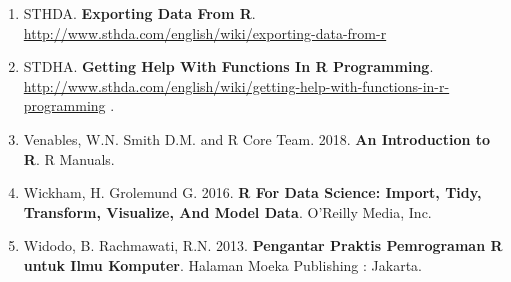 \documentclass[12pt,]{krantz}
\begin{document}
\begin{enumerate}
\item
  STHDA. \textbf{Exporting Data From R}. \url{http://www.sthda.com/english/wiki/exporting-data-from-r}
\item
  STDHA. \textbf{Getting Help With Functions In R Programming}. \url{http://www.sthda.com/english/wiki/getting-help-with-functions-in-r-programming} .
\item
  Venables, W.N. Smith D.M. and R Core Team. 2018. \textbf{An Introduction to R}. R Manuals.
\item
  Wickham, H. Grolemund G. 2016. \textbf{R For Data Science: Import, Tidy, Transform, Visualize, And Model Data}. O'Reilly Media, Inc.
\item
  Widodo, B. Rachmawati, R.N. 2013. \textbf{Pengantar Praktis Pemrograman R untuk Ilmu Komputer}. Halaman Moeka Publishing : Jakarta.
\end{enumerate}



\backmatter
\printindex
\end{document}
